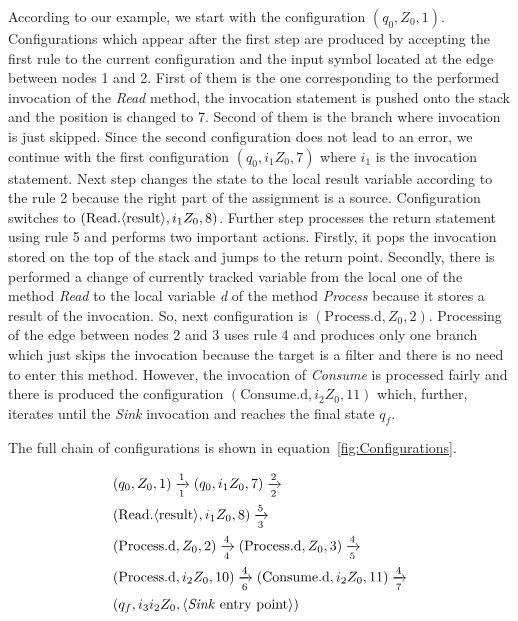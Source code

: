 According to our example, we start with the configuration $(q_0, Z_0, 1)$.
Configurations which appear after the first step are produced by accepting the first rule to the current configuration and the input symbol located at the edge between nodes 1 and 2.
First of them is the one corresponding to the performed invocation of the \textit{Read} method, the invocation statement is pushed onto the stack and the position is changed to 7. Second of them is the branch where invocation is just skipped.
Since the second configuration does not lead to an error, we continue with the first configuration $(q_0, i_1 Z_0, 7)$ where $i_1$ is the invocation statement.
Next step changes the state to the local \textlangle{}result\textrangle{} variable according to the rule 2 because the right part of the assignment is a source. Configuration switches to $(\text{Read.\textlangle{}result\textrangle{}}, i_1 Z_0, 8)$.
Further step processes the return statement using rule 5 and performs two important actions.
Firstly, it pops the invocation stored on the top of the stack and jumps to the return point.
Secondly, there is performed a change of currently tracked variable from the local one of the method \textit{Read} to the local variable \textit{d} of the method \textit{Process} because it stores a result of the invocation.
So, next configuration is $(\text{Process.d}, Z_0, 2)$.
Processing of the edge between nodes 2 and 3 uses rule 4 and produces only one branch which just skips the invocation because the target is a filter and there is no need to enter this method.
However, the invocation of \textit{Consume} is processed fairly and there is produced the configuration $(\text{Consume.d}, i_2 Z_0, 11)$ which, further, iterates until the \textit{Sink} invocation and reaches the final state $q_f$.

The full chain of configurations is shown in equation~\ref{fig:Configurations}.

\begin{equation}
	\label{fig:Configurations}
	\begin{split}
		& (q_0, Z_0, 1) \xrightarrow[1]{1} (q_0, i_1 Z_0, 7) \xrightarrow[2]{2} \\
		& (\text{Read.\textlangle{}result\textrangle{}}, i_1 Z_0, 8) \xrightarrow[3]{5} \\
		& (\text{Process.d}, Z_0, 2) \xrightarrow[4]{4} (\text{Process.d}, Z_0, 3) \xrightarrow[5]{4} \\
		& (\text{Process.d}, i_2 Z_0, 10) \xrightarrow[6]{4} (\text{Consume.d}, i_2 Z_0, 11) \xrightarrow[7]{4} \\
		& (q_f, i_3 i_2 Z_0, \text{\textlangle{}\textit{Sink} entry point\textrangle{}})
	\end{split}
\end{equation}

